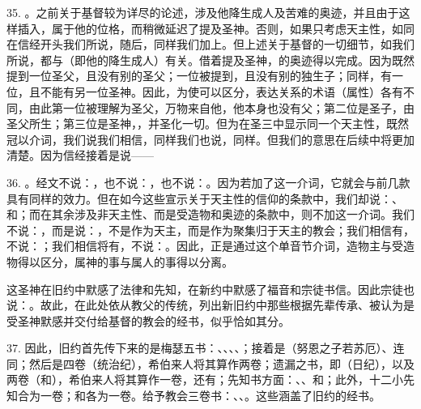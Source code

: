 35. 。之前关于基督较为详尽的论述，涉及他降生成人及苦难的奥迹，并且由于这样插入，属于他的位格，而稍微延迟了提及圣神。否则，如果只考虑天主性，如同在信经开头我们所说，随后，同样我们加上。但上述关于基督的一切细节，如我们所说，都与（即他的降生成人）有关。借着提及圣神，的奥迹得以完成。因为既然提到一位圣父，且没有别的圣父；一位被提到，且没有别的独生子；同样，有一位，且不能有另一位圣神。因此，为使可以区分，表达关系的术语（属性）各有不同，由此第一位被理解为圣父，万物来自他，他本身也没有父；第二位是圣子，由圣父所生；第三位是圣神，，并圣化一切。但为在圣三中显示同一个天主性，既然冠以介词，我们说我们相信，同样我们也说，同样。但我们的意思在后续中将更加清楚。因为信经接着是说——\par

36. 。经文不说：，也不说：，也不说：。因为若加了这一介词，它就会与前几款具有同样的效力。但在如今这些宣示关于天主性的信仰的条款中，我们却说：、和；而在其余涉及非天主性、而是受造物和奥迹的条款中，则不加这一介词。我们不说：，而是说：，不是作为天主，而是作为聚集归于天主的教会；我们相信有，不说：；我们相信将有，不说：。因此，正是通过这个单音节介词，造物主与受造物得以区分，属神的事与属人的事得以分离。\par

这圣神在旧约中默感了法律和先知，在新约中默感了福音和宗徒书信。因此宗徒也说：。故此，在此处依从教父的传统，列出新旧约中那些根据先辈传承、被认为是受圣神默感并交付给基督的教会的经书，似乎恰如其分。\par

37. 因此，旧约首先传下来的是梅瑟五书：、、、、；接着是（努恩之子若苏厄）、连同；然后是四卷（统治纪），希伯来人将其算作两卷；遗漏之书，即（日纪），以及两卷（和），希伯来人将其算作一卷，还有；先知书方面：、、和；此外，十二小先知合为一卷；和各为一卷。给予教会三卷书：、、。这些涵盖了旧约的经书。\par

